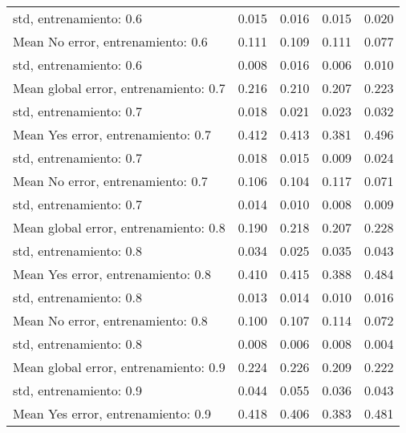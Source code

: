 \begin{longtable}{p{4cm}|p{1.5cm}|p{1.5cm}|p{1.5cm}|p{1.5cm}}
std, entrenamiento: 0.6               & 0.015 &        0.016 &     0.015 &                        0.020 \\
Mean No error, entrenamiento: 0.6     & 0.111 &        0.109 &     0.111 &                        0.077 \\
std, entrenamiento: 0.6               & 0.008 &        0.016 &     0.006 &                        0.010 \\
Mean global error, entrenamiento: 0.7 & 0.216 &        0.210 &     0.207 &                        0.223 \\
std, entrenamiento: 0.7               & 0.018 &        0.021 &     0.023 &                        0.032 \\
Mean Yes error, entrenamiento: 0.7    & 0.412 &        0.413 &     0.381 &                        0.496 \\
std, entrenamiento: 0.7               & 0.018 &        0.015 &     0.009 &                        0.024 \\
Mean No error, entrenamiento: 0.7     & 0.106 &        0.104 &     0.117 &                        0.071 \\
std, entrenamiento: 0.7               & 0.014 &        0.010 &     0.008 &                        0.009 \\
Mean global error, entrenamiento: 0.8 & 0.190 &        0.218 &     0.207 &                        0.228 \\
std, entrenamiento: 0.8               & 0.034 &        0.025 &     0.035 &                        0.043 \\
Mean Yes error, entrenamiento: 0.8    & 0.410 &        0.415 &     0.388 &                        0.484 \\
std, entrenamiento: 0.8               & 0.013 &        0.014 &     0.010 &                        0.016 \\
Mean No error, entrenamiento: 0.8     & 0.100 &        0.107 &     0.114 &                        0.072 \\
std, entrenamiento: 0.8               & 0.008 &        0.006 &     0.008 &                        0.004 \\
Mean global error, entrenamiento: 0.9 & 0.224 &        0.226 &     0.209 &                        0.222 \\
std, entrenamiento: 0.9               & 0.044 &        0.055 &     0.036 &                        0.043 \\
Mean Yes error, entrenamiento: 0.9    & 0.418 &        0.406 &     0.383 &                        0.481 \\

\end{longtable}
